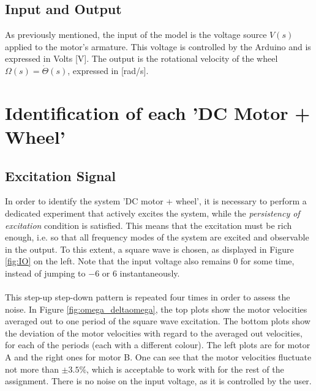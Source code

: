 \documentclass[a4paper,kul]{kulakarticle} %
\begin{document}

\subsection{Input and Output}
As previously mentioned, the input of the model is the voltage source $V(s)$ applied to the motor's armature. This voltage is controlled by the Arduino and is expressed in Volts [V]. The output is the rotational velocity of the wheel  $\Omega(s) = \dot{\Theta}(s)$, expressed in [rad/s].


\section{Identification of each 'DC Motor + Wheel'}
\subsection{Excitation Signal}
In order to identify the system 'DC motor + wheel', it is necessary to perform a dedicated experiment that actively excites the system, while the \textit{persistency of excitation} condition is satisfied. This means that the excitation must be rich enough, i.e. so that all frequency modes of the system are excited and observable in the output. To this extent, a square wave is chosen, as displayed in Figure \ref{fig:IO} on the left. Note that the input voltage also remains $0$ for some time, instead of jumping to $-6$ or $6$ instantaneously. 
\\\\
This step-up step-down pattern is repeated four times in order to assess the noise. In Figure \ref{fig:omega_deltaomega}, the top plots show the motor velocities averaged out to one period of the square wave excitation. The bottom plots show the deviation of the motor velocities with regard to the averaged out velocities, for each of the periods (each with a different colour). The left plots are for motor A and the right ones for motor B. One can see that the motor velocities fluctuate not more than $\pm 3.5\%$, which is acceptable to work with for the rest of the assignment. There is no noise on the input voltage, as it is controlled by the user.
\end{document}
